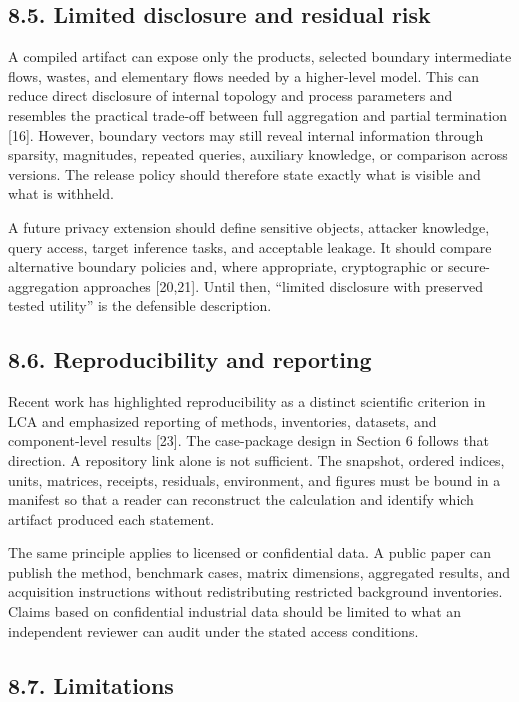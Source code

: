 \documentclass[
  10pt,
  a4paper,
  DIV=11,
  numbers=noendperiod]{scrartcl}
\begin{document}
\subsection{8.5. Limited disclosure and residual
risk}\label{limited-disclosure-and-residual-risk}

A compiled artifact can expose only the products, selected boundary
intermediate flows, wastes, and elementary flows needed by a
higher-level model. This can reduce direct disclosure of internal
topology and process parameters and resembles the practical trade-off
between full aggregation and partial termination {[}16{]}. However,
boundary vectors may still reveal internal information through sparsity,
magnitudes, repeated queries, auxiliary knowledge, or comparison across
versions. The release policy should therefore state exactly what is
visible and what is withheld.

A future privacy extension should define sensitive objects, attacker
knowledge, query access, target inference tasks, and acceptable leakage.
It should compare alternative boundary policies and, where appropriate,
cryptographic or secure-aggregation approaches {[}20,21{]}. Until then,
``limited disclosure with preserved tested utility'' is the defensible
description.

\subsection{8.6. Reproducibility and
reporting}\label{reproducibility-and-reporting}

Recent work has highlighted reproducibility as a distinct scientific
criterion in LCA and emphasized reporting of methods, inventories,
datasets, and component-level results {[}23{]}. The case-package design
in Section 6 follows that direction. A repository link alone is not
sufficient. The snapshot, ordered indices, units, matrices, receipts,
residuals, environment, and figures must be bound in a manifest so that
a reader can reconstruct the calculation and identify which artifact
produced each statement.

The same principle applies to licensed or confidential data. A public
paper can publish the method, benchmark cases, matrix dimensions,
aggregated results, and acquisition instructions without redistributing
restricted background inventories. Claims based on confidential
industrial data should be limited to what an independent reviewer can
audit under the stated access conditions.

\subsection{8.7. Limitations}\label{limitations}
\end{document}
